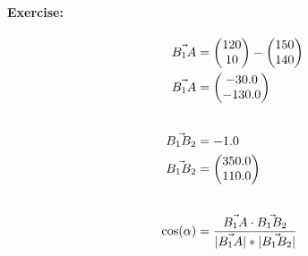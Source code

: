 \paragraph{Exercise:} 
\begin{align}
    \vec{B_1A} &= \vA - \vBOne \\
    \vec{B_1A} &= \vBOneA  \\[20pt]
    \vec{B_1B_2} &= \pgfmathparse{1 - 2} \pgfmathresult \\
    \vec{B_1B_2} &= \vBOneBTwo \\[20pt]
    \cos(\alpha) &= \frac{\vec{B_1A} \cdot \vec{B_1B_2}}{|\vec{B_1A}| * |\vec{B_1B_2}|}
\end{align}
